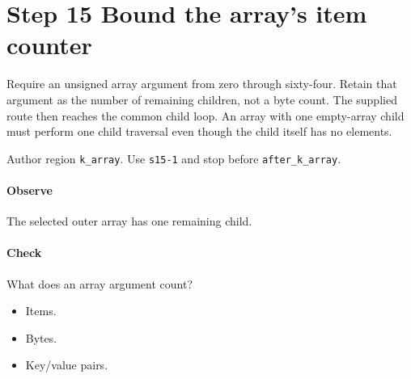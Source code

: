 \section{Step 15 Bound the array's item counter}\label{cbor-s15}
Require an unsigned array argument from zero through sixty-four. Retain that argument as the number of remaining children, not a byte count. The supplied route then reaches the common child loop. An array with one empty-array child must perform one child traversal even though the child itself has no elements.

Author region \texttt{k\_array}. Use \texttt{s15-1} and stop before \texttt{after\_k\_array}.

\paragraph{Observe} The selected outer array has one remaining child.

\paragraph{Check} What does an array argument count?
\begin{itemize}
\item[A.] Items.
\item[B.] Bytes.
\item[C.] Key/value pairs.
\end{itemize}
